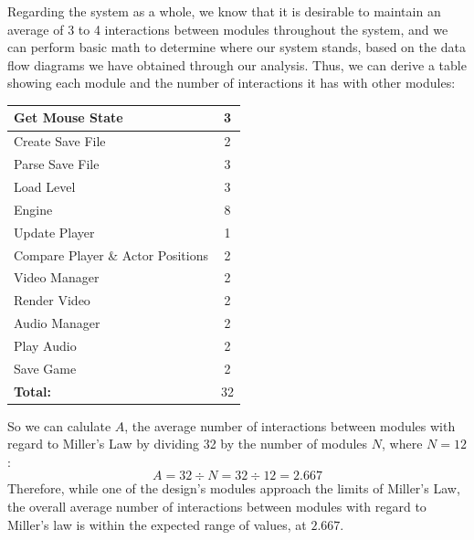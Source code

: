 \documentclass{article}
\begin{document}
			Regarding the system as a whole, we know that it is desirable to maintain an average of 3 to 4 interactions between modules throughout the system, and we can perform basic math to determine where our system stands, based on the data flow diagrams we have obtained through our analysis. Thus, we can derive a table showing each module and the number of interactions it has with other modules:
			\begin{center}
				\begin{tabular}{| l || c |}
					\hline
					Get Mouse State 					& 3 \\ \hline
					Create Save File					& 2 \\ \hline
					Parse Save File 					& 3 \\ \hline
					Load Level							& 3 \\ \hline
					Engine								& 8 \\ \hline
					Update Player						& 1 \\ \hline
					Compare Player \& Actor Positions	& 2 \\ \hline
					Video Manager						& 2 \\ \hline
					Render Video						& 2 \\ \hline
					Audio Manager						& 2 \\ \hline
					Play Audio							& 2 \\ \hline
					Save Game							& 2 \\ \hline
					\textbf{Total:}						& 32 \\
					\hline
				\end{tabular}
			\end{center}
			So we can calulate $A$, the average number of interactions between modules with regard to Miller's Law by dividing 32 by the number of modules $N$, where $N = 12$: 
			$$A = 32 \div N = 32 \div 12 = 2.667$$
			Therefore, while one of the design's modules approach the limits of Miller's Law, the overall average number of interactions between modules with regard to Miller's law is within the expected range of values, at $2.667$. 
\end{document}
